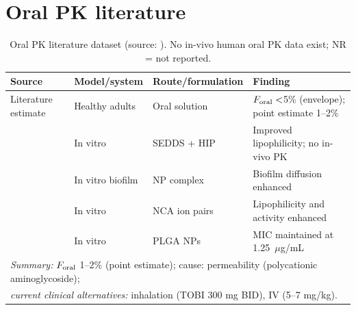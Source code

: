 \section{Oral PK literature}
\begin{table}[htbp]
\centering
\caption{Oral PK literature dataset (source: ). No in-vivo human oral PK data exist; NR = not reported.}
\label{tab:oralpk-full}
\small
\begin{tabular}{p{3.2cm}p{3.0cm}p{2.6cm}p{5.0cm}}
\toprule
Source & Model/system & Route/formulation & Finding\\
\midrule
Literature estimate & Healthy adults & Oral solution & $F_{\mathrm{oral}} <$5\% (envelope); point estimate 1--2\%\\
\citet{Asad2023} & In vitro & SEDDS + HIP & Improved lipophilicity; no in-vivo PK\\
\citet{BlancoCabra2022} & In vitro biofilm & NP complex & Biofilm diffusion enhanced\\
\citet{Khaled2026} & In vitro & NCA ion pairs & Lipophilicity and activity enhanced\\
\citet{Hill2019} & In vitro & PLGA NPs & MIC maintained at 1.25~$\mu$g/mL\\
\midrule
\multicolumn{4}{l}{\emph{Summary:} $F_{\mathrm{oral}}$ 1--2\% (point estimate); cause: permeability (polycationic aminoglycoside);}\\
\multicolumn{4}{l}{\emph{current clinical alternatives:} inhalation (TOBI 300 mg BID), IV (5--7 mg/kg).}\\
\bottomrule
\end{tabular}
\end{table}

